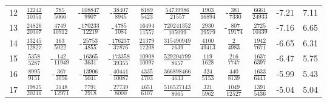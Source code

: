 \begin{sidewaystable}
\begin{tabular}{r|ccccccccc|c@{ -- }c@{\%}}
12
&  $\frac{           12242}{           10351}$
&  $\frac{             785}{            5066}$
& -$\frac{          108847}{            9907}$
& -$\frac{           38407}{            8945}$
&  $\frac{            8189}{            5423}$
&  $\frac{        54739986}{           21557}$
&  $\frac{            1903}{           16894}$
& -$\frac{             381}{            7330}$
&  $\frac{            6661}{           24933}$
&  -7.21 &  7.11
\\
13
&  $\frac{           24826}{           20307}$
&  $\frac{            4749}{           40912}$
& -$\frac{          170233}{           12219}$
& -$\frac{            4785}{            1084}$
&  $\frac{           16494}{           11557}$
&  $\frac{       720241352}{          105099}$
&  $\frac{            2930}{           29579}$
& -$\frac{             807}{           19174}$
&  $\frac{            2725}{           10439}$
&  -7.16 &  6.65
\\
14
&  $\frac{           13245}{           12827}$
&  $\frac{             163}{            5022}$
& -$\frac{           25753}{            4855}$
& -$\frac{          176237}{           37876}$
&  $\frac{           21379}{           17208}$
&  $\frac{       315490949}{            7639}$
&  $\frac{            4100}{           49413}$
&  $\frac{               2}{            4983}$
&  $\frac{            1942}{            7671}$
&  -6.65 &  6.31
\\
15
&  $\frac{            5358}{            5287}$
& -$\frac{             142}{           11949}$
& -$\frac{           16365}{            3631}$
& -$\frac{          173358}{           39355}$
&  $\frac{           10908}{           10097}$
&  $\frac{       529204799}{            8657}$
&  $\frac{             119}{            1628}$
&  $\frac{             216}{            7747}$
&  $\frac{            1637}{            6397}$
&  -6.47 &  5.75
\\
16
&  $\frac{            8995}{            9151}$
& -$\frac{             367}{            3056}$
& -$\frac{           13906}{            5041}$
& -$\frac{           40441}{           10087}$
&  $\frac{            4335}{            4703}$
&  $\frac{       366898466}{            4633}$
&  $\frac{             324}{            5153}$
&  $\frac{             440}{            8139}$
&  $\frac{            1633}{            6441}$
&  -5.99 &  5.43
\\
17
&  $\frac{           19825}{           20211}$
& -$\frac{            3148}{           12971}$
& -$\frac{            7791}{            2918}$
& -$\frac{           27739}{            8000}$
&  $\frac{            4651}{            6107}$
&  $\frac{       516527143}{            8065}$
&  $\frac{             321}{            5962}$
&  $\frac{            1049}{           12527}$
&  $\frac{            1391}{            5436}$
&  -5.04 &  5.04
\end{tabular}
\end{sidewaystable}

